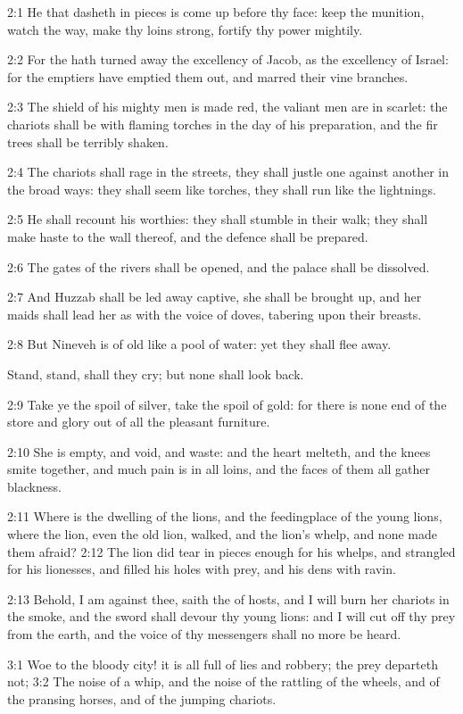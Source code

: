 2:1 He that dasheth in pieces is come up before thy face: keep the munition, watch the way, make thy loins strong, fortify thy power mightily.

2:2 For the \LORD hath turned away the excellency of Jacob, as the excellency of Israel: for the emptiers have emptied them out, and marred their vine branches.

2:3 The shield of his mighty men is made red, the valiant men are in scarlet: the chariots shall be with flaming torches in the day of his preparation, and the fir trees shall be terribly shaken.

2:4 The chariots shall rage in the streets, they shall justle one against another in the broad ways: they shall seem like torches, they shall run like the lightnings.

2:5 He shall recount his worthies: they shall stumble in their walk; they shall make haste to the wall thereof, and the defence shall be prepared.

2:6 The gates of the rivers shall be opened, and the palace shall be dissolved.

2:7 And Huzzab shall be led away captive, she shall be brought up, and her maids shall lead her as with the voice of doves, tabering upon their breasts.

2:8 But Nineveh is of old like a pool of water: yet they shall flee away.

Stand, stand, shall they cry; but none shall look back.

2:9 Take ye the spoil of silver, take the spoil of gold: for there is none end of the store and glory out of all the pleasant furniture.

2:10 She is empty, and void, and waste: and the heart melteth, and the knees smite together, and much pain is in all loins, and the faces of them all gather blackness.

2:11 Where is the dwelling of the lions, and the feedingplace of the young lions, where the lion, even the old lion, walked, and the lion's whelp, and none made them afraid?  2:12 The lion did tear in pieces enough for his whelps, and strangled for his lionesses, and filled his holes with prey, and his dens with ravin.

2:13 Behold, I am against thee, saith the \LORD of hosts, and I will burn her chariots in the smoke, and the sword shall devour thy young lions: and I will cut off thy prey from the earth, and the voice of thy messengers shall no more be heard.

3:1 Woe to the bloody city! it is all full of lies and robbery; the prey departeth not; 3:2 The noise of a whip, and the noise of the rattling of the wheels, and of the pransing horses, and of the jumping chariots.

